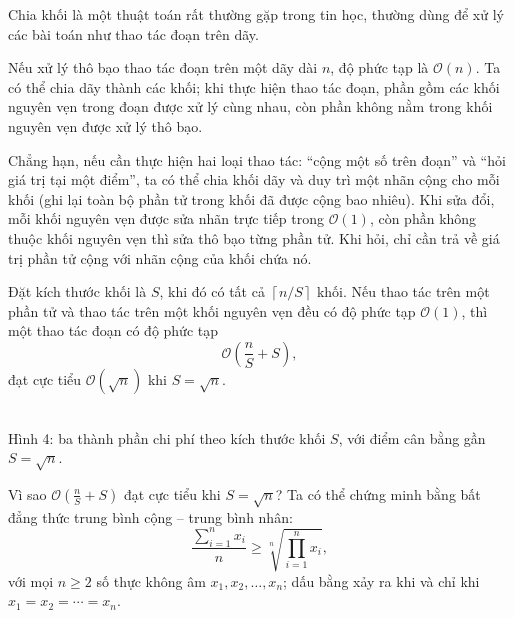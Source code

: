 \documentclass[11pt]{article}
\newcommand{\Oh}{\mathcal{O}}
\begin{document}
Chia khối là một thuật toán rất thường gặp trong tin học, thường dùng để xử lý
các bài toán như thao tác đoạn trên dãy.

Nếu xử lý thô bạo thao tác đoạn trên một dãy dài \(n\), độ phức tạp là
\(\Oh(n)\). Ta có thể chia dãy thành các khối; khi thực hiện thao tác đoạn,
phần gồm các khối nguyên vẹn trong đoạn được xử lý cùng nhau, còn phần không
nằm trong khối nguyên vẹn được xử lý thô bạo.

Chẳng hạn, nếu cần thực hiện hai loại thao tác: ``cộng một số trên đoạn'' và
``hỏi giá trị tại một điểm'', ta có thể chia khối dãy và duy trì một nhãn cộng
cho mỗi khối (ghi lại toàn bộ phần tử trong khối đã được cộng bao nhiêu). Khi
sửa đổi, mỗi khối nguyên vẹn được sửa nhãn trực tiếp trong \(\Oh(1)\), còn
phần không thuộc khối nguyên vẹn thì sửa thô bạo từng phần tử. Khi hỏi, chỉ
cần trả về giá trị phần tử cộng với nhãn cộng của khối chứa nó.

Đặt kích thước khối là \(S\), khi đó có tất cả \(\left\lceil n/S\right\rceil\)
khối. Nếu thao tác trên một phần tử và thao tác trên một khối nguyên vẹn đều
có độ phức tạp \(\Oh(1)\), thì một thao tác đoạn có độ phức tạp
\[
  \Oh\left(\frac{n}{S}+S\right),
\]
đạt cực tiểu \(\Oh(\sqrt n)\) khi \(S=\sqrt n\).

\begin{center}
\\[-0.2em]
{\small Hình 4: ba thành phần chi phí theo kích thước khối \(S\), với điểm cân bằng gần \(S=\sqrt n\).}
\end{center}

Vì sao \(\Oh\left(\frac nS+S\right)\) đạt cực tiểu khi \(S=\sqrt n\)? Ta có
thể chứng minh bằng bất đẳng thức trung bình cộng -- trung bình nhân:
\[
  \frac{\sum_{i=1}^{n}x_i}{n}\ge
  \sqrt[n]{\prod_{i=1}^{n}x_i},
\]
với mọi \(n\ge 2\) số thực không âm \(x_1,x_2,\ldots,x_n\); dấu bằng xảy ra
khi và chỉ khi \(x_1=x_2=\cdots=x_n\).
\end{document}
